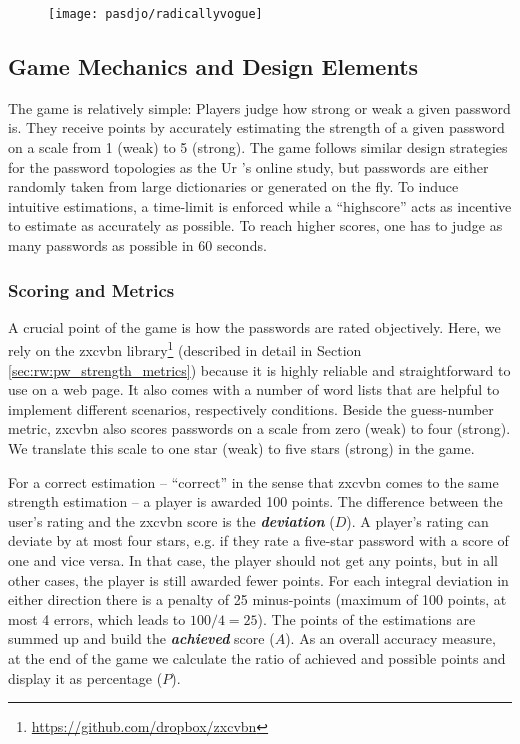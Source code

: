 \begin{figure}
	\centering
	\texttt{[image: pasdjo/radicallyvogue]}
	\caption{\label{fig:pasdjo:radicallyvogue}}
\end{figure}

\subsection{Game Mechanics and Design Elements}
The game is relatively simple: Players judge how strong or weak a given password is. They receive points by accurately estimating the strength of a given password on a scale from 1 (weak) to 5 (strong). The game follows similar design strategies for the password topologies as the Ur \etal's online study, but passwords are either randomly taken from large dictionaries or generated on the fly. To induce intuitive estimations, a time-limit is enforced while a ``highscore'' acts as incentive to estimate as accurately as possible. To reach higher scores, one has to judge as many passwords as possible in 60 seconds. 

\subsubsection{Scoring and Metrics}
A crucial point of the game is how the passwords are rated objectively. Here, we rely on the zxcvbn library\footnote{\url{https://github.com/dropbox/zxcvbn}} (described in detail in Section \ref{sec:rw:pw_strength_metrics}) because it is highly reliable and straightforward to use on a web page. It also comes with a number of word lists that are helpful to implement different scenarios, respectively conditions. Beside the guess-number metric, zxcvbn also scores passwords on a scale from zero (weak) to four (strong). We translate this scale to one star (weak) to five stars (strong) in the game. 

For a correct estimation -- ``correct'' in the sense that zxcvbn comes to the same strength estimation -- a player is awarded 100 points. The difference between the user's rating and the zxcvbn score is  the \textbf{\textit{deviation}} ($D$). A player's rating can deviate by at most four stars, e.g. if they rate a five-star password with a score of one and vice versa. In that case, the player should not get any points, but in all other cases, the player is still awarded fewer points. For each integral deviation in either direction there is a penalty of 25 minus-points (maximum of 100 points, at most 4 errors, which leads to $100 / 4 = 25$). The points of the estimations are summed up and build the \textbf{\textit{achieved}} score ($A$). As an overall accuracy measure, at the end of the game we calculate the ratio of achieved and possible points and display it as percentage ($P$). 

